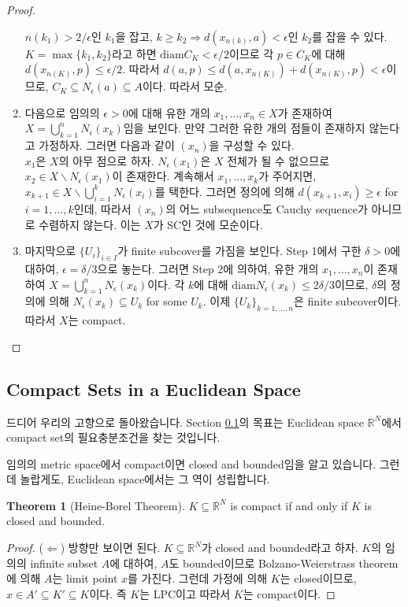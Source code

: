 \documentclass[12pt]{article}
\theoremstyle{definition}
\newtheorem{thm}{Theorem}[section]
\def\RR{\mathbb{R}}
\def\eps{\epsilon}
\begin{document}
\begin{proof}
\begin{enumerate}[label={Step \arabic*}, leftmargin=3\parindent]
			\(n(k_1) > 2/\eps\)인 \(k_1\)을 잡고, \(k \ge k_2 \Rightarrow d(x_{n(k)}, a) < \eps\)인 \(k_2\)를 잡을 수 있다. \(K = \max\{k_1, k_2\}\)라고 하면 \(\mathrm{diam}C_K < \eps / 2\)이므로 각 \(p \in C_K\)에 대해 \(d(x_{n(K)}, p) \le \eps / 2\). 따라서 \(d(a, p) \le d(a, x_{n(K)}) + d(x_{n(K)}, p) < \eps\)이므로, \(C_K \subseteq N_\eps (a) \subseteq A\)이다. 따라서 모순. 
			\item
			다음으로 임의의 \(\eps > 0\)에 대해 유한 개의 \(x_1, \ldots, x_n \in X\)가 존재하여 \(X = \bigcup_{k=1}^n N_\eps (x_k)\)임을 보인다. 만약 그러한 유한 개의 점들이 존재하지 않는다고 가정하자. 그러면 다음과 같이 \((x_n)\)을 구성할 수 있다.\\
			\(x_1\)은 \(X\)의 아무 점으로 하자. \(N_\eps (x_1)\)은 \(X\) 전체가 될 수 없으므로 \(x_2 \in X \backslash N_\eps (x_1)\)이 존재한다. 계속해서 \(x_1, \ldots, x_k\)가 주어지면, \(x_{k+1} \in X \backslash \bigcup_{i=1}^k N_\eps (x_i)\)를 택한다. 그러면 정의에 의해 \(d(x_{k+1}, x_i) \ge \eps\) for \(i = 1, \ldots, k\)인데, 따라서 \((x_n)\)의 어느 subsequence도 Cauchy sequence가 아니므로 수렴하지 않는다. 이는 \(X\)가 SC인 것에 모순이다.
			\item
			마지막으로 \(\{U_i\}_{i \in I}\)가 finite subcover를 가짐을 보인다. Step 1에서 구한 \(\delta > 0\)에 대하여, \(\eps = \delta / 3\)으로 놓는다. 그러면 Step 2에 의하여, 유한 개의 \(x_1, \ldots, x_n\)이 존재하여 \(X = \bigcup_{k=1}^n N_\eps (x_k)\)이다. 각 \(k\)에 대해 \(\mathrm{diam}N_\eps(x_k) \le 2 \delta / 3\)이므로, \(\delta\)의 정의에 의해 \(N_\eps(x_k) \subseteq U_k\) for some \(U_k\). 이제 \(\{U_k\}_{k = 1, \ldots, n}\)은 finite subcover이다. 따라서 \(X\)는 compact.
		\end{enumerate}
	\end{proof}

\subsection{Compact Sets in a Euclidean Space} \label{sec hb}

드디어 우리의 고향으로 돌아왔습니다. Section \ref{sec hb}의 목표는 Euclidean space \(\RR^N\)에서 compact set의 필요충분조건을 찾는 것입니다.

임의의 metric space에서 compact이면 closed and bounded임을 알고 있습니다. 그런데 놀랍게도, Euclidean space에서는 그 역이 성립합니다.

	\begin{thm} [Heine-Borel Theorem]
		\(K \subseteq \RR^N\) is compact if and only if \(K\) is closed and bounded.
	\end{thm}
	\begin{proof}
		($\Leftarrow$) 방향만 보이면 된다. \(K \subseteq \RR^N\)가 closed and bounded라고 하자. \(K\)의 임의의 infinite subset \(A\)에 대하여, \(A\)도 bounded이므로 Bolzano-Weierstrass theorem에 의해 \(A\)는 limit point \(x\)를 가진다. 그런데 가정에 의해 \(K\)는 closed이므로, \(x \in A' \subseteq K' \subseteq K\)이다. 즉 \(K\)는 LPC이고 따라서 \(K\)는 compact이다.
	\end{proof}
\end{document}
